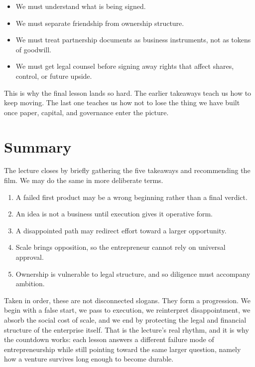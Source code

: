 \begin{itemize}
\item We must understand what is being signed.
\item We must separate friendship from ownership structure.
\item We must treat partnership documents as business instruments, not as tokens of goodwill.
\item We must get legal counsel before signing away rights that affect shares, control, or future upside.
\end{itemize}

This is why the final lesson lands so hard. The earlier takeaways teach us how to keep moving. The last one teaches us how not to lose the thing we have built once paper, capital, and governance enter the picture.

\section{Summary}

The lecture closes by briefly gathering the five takeaways and recommending the film. We may do the same in more deliberate terms.

\begin{enumerate}
\item A failed first product may be a wrong beginning rather than a final verdict.
\item An idea is not a business until execution gives it operative form.
\item A disappointed path may redirect effort toward a larger opportunity.
\item Scale brings opposition, so the entrepreneur cannot rely on universal approval.
\item Ownership is vulnerable to legal structure, and so diligence must accompany ambition.
\end{enumerate}

Taken in order, these are not disconnected slogans. They form a progression. We begin with a false start, we pass to execution, we reinterpret disappointment, we absorb the social cost of scale, and we end by protecting the legal and financial structure of the enterprise itself. That is the lecture's real rhythm, and it is why the countdown works: each lesson answers a different failure mode of entrepreneurship while still pointing toward the same larger question, namely how a venture survives long enough to become durable.